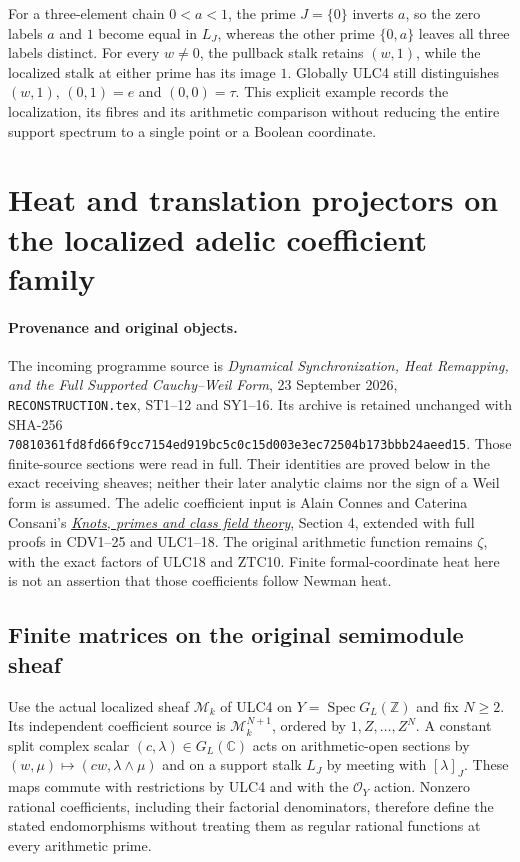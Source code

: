 \documentclass[11pt,a4paper]{article}
\theoremstyle{definition}\newtheorem{definition}[theorem]{Definition}
\begin{document}
For a three-element chain $0<a<1$, the prime $J=\{0\}$ inverts
$a$, so the zero labels $a$ and $1$ become equal in $L_J$, whereas
the other prime $\{0,a\}$ leaves all three labels distinct.
For every $w\ne0$, the pullback stalk retains $(w,1)$, while the
localized stalk at either prime has its image $1$. Globally ULC4
still distinguishes $(w,1)$, $(0,1)=e$ and $(0,0)=\tau$.
This explicit example records the localization, its fibres and its
arithmetic comparison without reducing the entire support spectrum
to a single point or a Boolean coordinate.

\clearpage

\section{Heat and translation projectors on the localized adelic coefficient family}
\label{sec:cc-localized-shift}

\paragraph{Provenance and original objects.}
The incoming programme source is \emph{Dynamical Synchronization, Heat
Remapping, and the Full Supported Cauchy--Weil Form}, 23 September 2026,
\texttt{RECONSTRUCTION.tex}, ST1--12 and SY1--16. Its archive is retained
unchanged with SHA-256
\texttt{70810361fd8fd66f9cc7154ed919bc5c0c15d003e3ec72504b173bbb24aeed15}.
Those finite-source sections were read in full. Their identities are
proved below in the exact receiving sheaves; neither their later
analytic claims nor the sign of a Weil form is assumed. The adelic
coefficient input is Alain Connes and Caterina Consani's
\href{https://arxiv.org/abs/2501.06560v1}{\emph{Knots, primes and class
field theory}}, Section 4, extended with full proofs in CDV1--25 and
ULC1--18. The original arithmetic function remains $\zeta$, with
the exact factors of ULC18 and ZTC10. Finite formal-coordinate heat
here is not an assertion that those coefficients follow Newman heat.

\subsection{Finite matrices on the original semimodule sheaf}
Use the actual localized sheaf $\mathcal M_k$ of ULC4 on
$Y=\operatorname{Spec}G_L(\mathbb Z)$ and fix $N\ge2$.
Its independent coefficient source is $\mathcal M_k^{N+1}$,
ordered by $1,Z,\ldots,Z^N$. A constant split complex scalar
$(c,\lambda)\in G_L(\mathbb C)$ acts on arithmetic-open sections by
$(w,\mu)\mapsto(cw,\lambda\wedge\mu)$ and on a support stalk
$L_J$ by meeting with $[\lambda]_J$. These maps commute with
restrictions by ULC4 and with the $\mathcal O_Y$ action. Nonzero
rational coefficients, including their factorial denominators,
therefore define the stated endomorphisms without treating them
as regular rational functions at every arithmetic prime.
\end{document}
